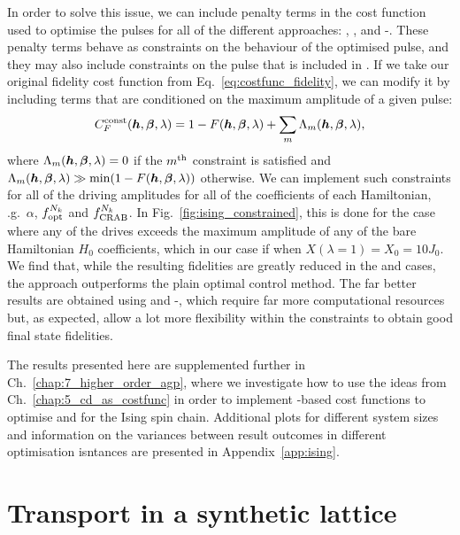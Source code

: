 In order to solve this issue, we can include penalty terms in the cost function used to optimise the pulses for all of the different approaches: , ,  and -. These penalty terms behave as constraints on the behaviour of the optimised pulse, and they may also include constraints on the  pulse that is included in . If we take our original fidelity cost function from Eq.~\eqref{eq:costfunc_fidelity}, we can modify it by including terms that are conditioned on the maximum amplitude of a given pulse:
\begin{equation}
    C_F^{\rm const}(\boldsymbol{h}, \boldsymbol{\beta}, \lambda) = 1 - F(\boldsymbol{h}, \boldsymbol{\beta}, \lambda) + \sum_m \Lambda_m(\boldsymbol{h}, \boldsymbol{\beta}, \lambda),
\end{equation}
where $\Lambda_m(\boldsymbol{h}, \boldsymbol{\beta}, \lambda) = 0$ if the $m^{\rm th}$ constraint is satisfied and $\Lambda_m(\boldsymbol{h}, \boldsymbol{\beta}, \lambda) \gg \min(1 - F(\boldsymbol{h}, \boldsymbol{\beta}, \lambda))$ otherwise. We can implement such constraints for all of the driving amplitudes for all of the coefficients of each Hamiltonian, \@e.g.~$\alpha$, $f_{\rm opt}^{N_k}$ and $f_{\rm CRAB}^{N_k}$. In Fig.~\ref{fig:ising_constrained}, this is done for the case where any of the drives exceeds the maximum amplitude of any of the bare Hamiltonian $H_0$ coefficients, which in our case if when $X(\lambda = 1) = X_0 = 10J_0$. We find that, while the resulting fidelities are greatly reduced in the  and  cases, the  approach outperforms the plain optimal control method. The far better results are obtained using  and -, which require far more computational resources but, as expected, allow a lot more flexibility within the constraints to obtain good final state fidelities. 

The results presented here are supplemented further in Ch.~\ref{chap:7_higher_order_agp}, where we investigate how to use the ideas from Ch.~\ref{chap:5_cd_as_costfunc} in order to implement -based cost functions to optimise  and  for the Ising spin chain. Additional plots for different system sizes and information on the variances between result outcomes in different optimisation isntances are presented in Appendix~\ref{app:ising}.

\section{Transport in a synthetic lattice}\label{sec:5.3_synthetic}

